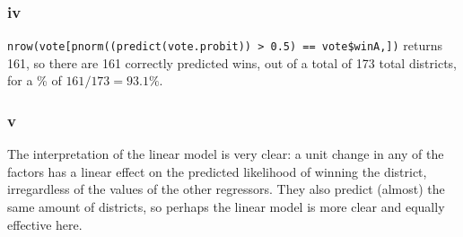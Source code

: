 \documentclass[12pt,letterpaper]{article}
\theoremstyle{definition}
\begin{document}
\subsubsection*{iv}

\verb|nrow(vote[pnorm((predict(vote.probit)) > 0.5) == vote$winA,])| returns 161, so there are 161 correctly predicted wins, out of a total of 173 total districts, for a \% of $161/173 = 93.1\%$.

\subsubsection*{v}

The interpretation of the linear model is very clear: a unit change in any of the factors has a linear effect on the predicted likelihood of winning the district, irregardless of the values of the other regressors. They also predict (almost) the same amount of districts, so perhaps the linear model is more clear and equally effective here.
\end{document}
